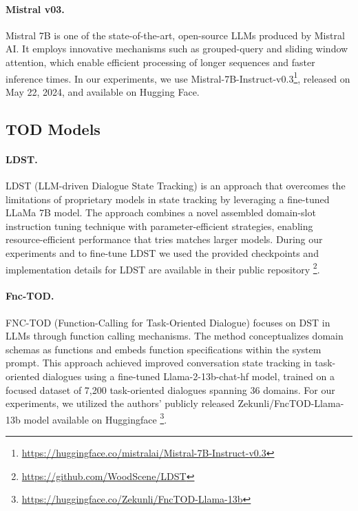 \paragraph{Mistral v03.} Mistral 7B \cite{jiang2023mistral} is one of the state-of-the-art, open-source LLMs produced by Mistral AI. It employs innovative mechanisms such as grouped-query and sliding window attention, which enable efficient processing of longer sequences and faster inference times. In our experiments, we use Mistral-7B-Instruct-v0.3\footnote{\url{https://huggingface.co/mistralai/Mistral-7B-Instruct-v0.3}}, released on May 22, 2024, and available on Hugging Face.


\subsection{TOD Models}
 
\paragraph{LDST.} LDST (LLM-driven Dialogue State Tracking) \cite{feng2023towards} is an approach that overcomes the limitations of proprietary models in state tracking by leveraging a fine-tuned LLaMa 7B model. The approach combines a novel assembled domain-slot instruction tuning technique with parameter-efficient strategies, enabling resource-efficient performance that tries matches larger models. During our experiments and to fine-tune LDST we used the provided checkpoints and implementation details for LDST are available in their public repository \footnote{\url{https://github.com/WoodScene/LDST}}.


\paragraph{Fnc-TOD.} FNC-TOD (Function-Calling for Task-Oriented Dialogue) focuses on DST in LLMs through function calling mechanisms. The method conceptualizes domain schemas as functions and embeds function specifications within the system prompt. This approach achieved improved conversation state tracking in task-oriented dialogues using a fine-tuned Llama-2-13b-chat-hf model, trained on a focused dataset of 7,200 task-oriented dialogues spanning 36 domains. For our experiments, we utilized the authors' publicly released Zekunli/FncTOD-Llama-13b model available on Huggingface \footnote{\url{https://huggingface.co/Zekunli/FncTOD-Llama-13b}}.


